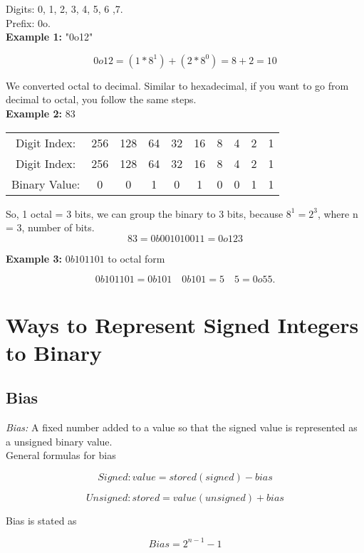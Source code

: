 \documentclass{article}
\begin{document}
\noindent Digits: 0, 1, 2, 3, 4, 5, 6 ,7. \\

\noindent Prefix: 0o. \\

\noindent \textbf{Example 1:} "0o12"

\[
0o12 = (1 * 8^1) + (2 * 8^0) = 8 + 2 = 10
\]

We converted octal to decimal. Similar to hexadecimal, if you want to go from decimal to octal, you follow
the same steps. \\

\noindent \textbf{Example 2:} $83$

\begin{center}
\begin{tabular}{c c c c c c c c c c}
Digit Index: & 256 & 128 & 64 & 32 & 16 & 8 & 4 & 2 & 1 \\ 
Digit Index: & 256 & 128 & 64 & 32 & 16 & 8 & 4 & 2 & 1 \\
Binary Value: & 0 & 0 & 1 & 0 & 1 & 0 & 0 & 1 & 1 \\
\end{tabular}
\end{center}

So, 1 octal = 3 bits, we can group the binary to 3 bits, because $8^1 = 2^3$, where n = 3, number 
of bits.
\[
83 = 0b001 010 011 = 0o123
\]

\noindent \textbf{Example 3:} $0b101101$ to octal form

\[
0b101101 = 0b101\quad 0b101 = 5\quad 5 = 0o55.
\]

\section{Ways to Represent Signed Integers to Binary}
\subsection*{Bias}
\textit{Bias:} A fixed number added to a value so that the signed value is represented as a unsigned binary value. \\

\noindent General formulas for bias

\[
Signed: value = stored(signed) - bias
\]

\[
Unsigned: stored = value(unsigned)  + bias
\]

\noindent Bias is stated as 

\[
Bias = 2^{n-1} - 1
\]
\end{document}
